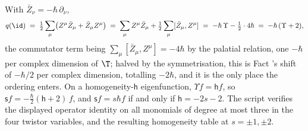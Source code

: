 With $\bar Z_\nu = -\hbar\,\partial_\nu$,
\[
q(\id) \;=\; \tfrac12\sum_\mu\bigl(Z^\mu \bar Z_\mu + \bar Z_\mu Z^\mu\bigr)
\;=\; \sum_\mu Z^\mu \bar Z_\mu + \tfrac12\sum_\mu [\bar Z_\mu, Z^\mu]
\;=\; -\hbar\,\Upsilon - \tfrac12\cdot 4\hbar \;=\; -\hbar\,(\Upsilon + 2),
\]
the commutator term being $\sum_\mu[\bar Z_\mu, Z^\mu] = -4\hbar$ by the palatial relation, one $-\hbar$ per complex dimension of $\T$; halved by the symmetrisation, this is Fact 's shift of $-\hbar/2$ per complex dimension, totalling $-2\hbar$, and it is the only place the ordering enters. On a homogeneity-$\mathsf{h}$ eigenfunction, $\Upsilon f = \mathsf{h} f$, so $\mathsf{s} f = -\tfrac{\hbar}{2}(\mathsf{h} + 2)\,f$, and $\mathsf{s} f = s\hbar f$ if and only if $\mathsf{h} = -2s - 2$. The script verifies the displayed operator identity on all monomials of degree at most three in the four twistor variables, and the resulting homogeneity table at $s = \pm 1, \pm 2$.
